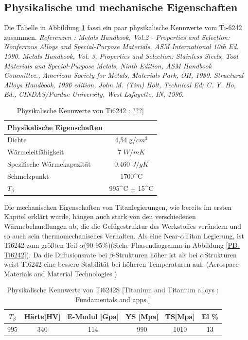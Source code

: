 \subsection{Physikalische und mechanische Eigenschaften }

Die Tabelle in Abbildung \ref{Phy.eig.} fasst ein paar physikalische Kennwerte vom Ti-6242 zusammen.
\newline
\textit{	Referenzen : 
	Metals Handbook, Vol.2 - Properties and Selection: Nonferrous Alloys and Special-Purpose Materials, ASM International 10th Ed. 1990.				
	Metals Handbook, Vol. 3, Properties and Selection: Stainless Steels, Tool Materials and Special-Purpose Metals, Ninth Edition, ASM Handbook Committee., American Society for Metals, Materials Park, OH, 1980.				
	Structural Alloys Handbook, 1996 edition, John M. (Tim) Holt, Technical Ed; C. Y. Ho, Ed., CINDAS/Purdue University, West Lafayette, IN, 1996. }

\begin{table}[H]
	\centering	
	\begin{tabular}{l c}
		
		Physikalische Eigenschaften & \\
		\hline
		Dichte& 4,54 g/$cm^3$\\
		Wärmeleitfähigkeit & 7 $W/mK$ \\
		Spezifische Wärmekapazität & 0.460 $J/gK$\\
		Schmelzpunkt & 1700^\circ C \\
		$T_{\beta}$ &  995^\circ C $\pm$ 15^\circ C \\
		\hline
		
	\end{tabular}
	\caption{Physikalische Kennwerte von Ti6242 : ???]}
	\label{Phy.eig.}
\end{table}


Die mechanischen Eigenschaften von Titanlegierungen, wie bereits im ersten Kapitel erklärt wurde, hängen auch stark von den verschiedenen Wärmebehandlungen ab, die die Gefügestruktur des Werkstoffes  verändern und so auch sein thermomechanisches Verhalten.
Als eine Near-$\alpha$Titan Legierung, ist Ti6242 zum größten Teil $\alpha$(90-95\%)(Siehe Phasendiagramm in Abbildung \ref{PD-Ti6242}). Da die Diffusionsrate bei $\beta$-Strukturen höher ist als bei $\alpha$Strukturen weist Ti6242 eine bessere Stabilität bei höheren Temperaturen auf. (Aerospace Materials and Material Technologies ) 

\begin{table}[H]
	\centering	
	\begin{tabular}{|c| c| c| c| c| c|}										
		\hline
		$T_{\beta}$ & Härte[HV] & E-Modul [Gpa]& YS [Mpa]&TS[Mpa]& El \% \\
		\hline
		995&340&114&990&1010&13\\
		\hline
	\end{tabular}
	\caption{Physikalische Kennwerte von Ti6242S [Titanium and Titanium alloys  : Fundamentals and apps.]}
	\label{Mec.}
\end{table}

